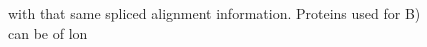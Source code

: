 \documentclass[a4paper,10pt]{report}
\begin{document}
\begin{figure}
\begin{center}
 with that same spliced alignment information. Proteins used for B) can be of lon
\end{center}
\end{figure}
\end{document}
